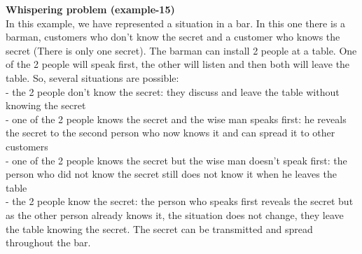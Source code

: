 \documentclass[11pt]{report}
\begin{document}
\tabto{0cm} {\Large \textbf{Whispering problem (example-15)}}
\vspace*{3pt}
\\
In this example, we have represented a situation in a bar. In this one there is a barman, customers who don't know the secret and a customer who knows the secret (There is only one secret). The barman can install 2 people at a table.  One of the 2 people will speak first, the other will listen and then both will leave the table. So, several situations are possible: \\
- the 2 people don't know the secret: they discuss and leave the table without knowing the secret \\
- one of the 2 people knows the secret and the wise man speaks first: he reveals the secret to the second person who now knows it and can spread it to other customers \\
- one of the 2 people knows the secret but the wise man doesn't speak first: the person who did not know the secret still does not know it when he leaves the table \\
- the 2 people know the secret: the person who speaks first reveals the secret but as the other person already knows it, the situation does not change, they leave the table knowing the secret.
The secret can be transmitted and spread throughout the bar.
\end{document}
